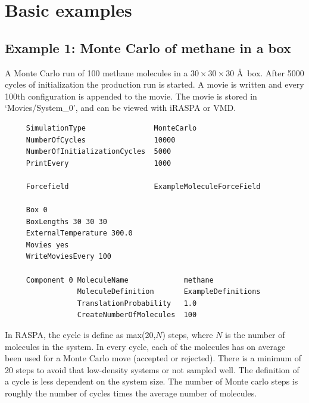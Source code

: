 \section{Basic examples}

\subsection*{Example 1: Monte Carlo of methane in a box}
A Monte Carlo run of 100 methane molecules in a $30\times30\times30$ \AA\ box.
After 5000 cycles of initialization the production run is started.
A movie is written and every 100th configuration is appended to the movie. 
The movie is stored in `Movies/System\_0',
and can be viewed with iRASPA or VMD.

\begin{tiny}
\begin{verbatim}
     SimulationType                MonteCarlo
     NumberOfCycles                10000
     NumberOfInitializationCycles  5000
     PrintEvery                    1000
     
     Forcefield                    ExampleMoleculeForceField
     
     Box 0
     BoxLengths 30 30 30
     ExternalTemperature 300.0
     Movies yes
     WriteMoviesEvery 100
     
     Component 0 MoleculeName             methane
                 MoleculeDefinition       ExampleDefinitions
                 TranslationProbability   1.0
                 CreateNumberOfMolecules  100

\end{verbatim}
\end{tiny}

In RASPA, the cycle is define as max(20,$N$) steps, where $N$ is the number of molecules in the system. In every cycle, each of the molecules
has on average been used for a Monte Carlo move (accepted or rejected). There is a minimum of 20 steps to avoid that low-density
systems or not sampled well. The definition of a cycle is less dependent on the system size. The number of Monte carlo steps
is roughly the number of cycles times the average number of molecules.

